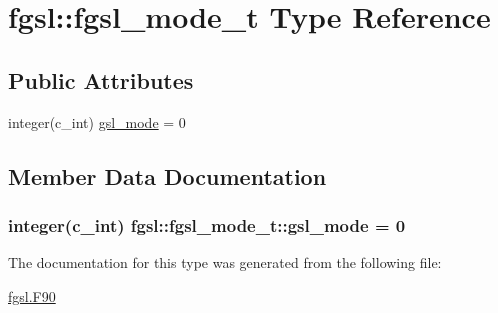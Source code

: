 \hypertarget{structfgsl_1_1fgsl__mode__t}{\section{fgsl\-:\-:fgsl\-\_\-mode\-\_\-t Type Reference}
\label{structfgsl_1_1fgsl__mode__t}
}
\subsection*{Public Attributes}
\begin{DoxyCompactItemize}
\item 
integer(c\-\_\-int) \hyperlink{structfgsl_1_1fgsl__mode__t_a97ca5f06a2af8316f03d3d0247d77e6d}{gsl\-\_\-mode} = 0
\end{DoxyCompactItemize}


\subsection{Member Data Documentation}
\hypertarget{structfgsl_1_1fgsl__mode__t_a97ca5f06a2af8316f03d3d0247d77e6d}{
\subsubsection[{gsl\-\_\-mode}]{\setlength{\rightskip}{0pt plus 5cm}integer(c\-\_\-int) fgsl\-::fgsl\-\_\-mode\-\_\-t\-::gsl\-\_\-mode = 0}}\label{structfgsl_1_1fgsl__mode__t_a97ca5f06a2af8316f03d3d0247d77e6d}


The documentation for this type was generated from the following file\-:\begin{DoxyCompactItemize}
\item 
\hyperlink{fgsl_8F90}{fgsl.\-F90}\end{DoxyCompactItemize}
